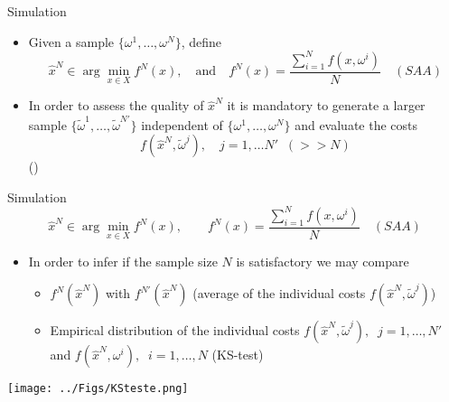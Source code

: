   
  
\begin{frame}{Simulation}

\begin{itemize}
\item Given a sample $\{\omega^1,\ldots,\omega^N\}$, define
\[
\hat x^N \in \arg \min_{x \in X} f^N(x), \quad \mbox{and}\quad f^N(x)=\frac{\sum_{i=1}^N f(x,\omega^i)}{N}\quad (SAA)
\]
\pula
\item In order to assess the quality of $\hat x^N$ it is mandatory to generate a  larger sample $\{\tilde \omega^1,\ldots,\tilde \omega^{N'}\}$ independent of $\{\omega^1,\ldots,\omega^N\}$ and evaluate the costs
\[
f(\hat x^N, \tilde \omega^j), \quad j=1,\ldots N' \;\; (>> N)
\]
()
\end{itemize}

 \end{frame} 



\begin{frame}{Simulation}
\[
\hat x^N \in \arg \min_{x \in X} f^N(x), \quad \quad f^N(x)=\frac{\sum_{i=1}^N f(x,\omega^i)}{N}\quad (SAA)
\]

\begin{itemize}
\item In order to infer if the sample size $N$  is satisfactory we may compare
\pula
\begin{itemize}
\item $f^N(\hat x^N)$ with $f^{N'}(\hat x^N)$   (average of the individual costs $f(\hat x^N, \tilde \omega^j)$)
\pula

\item Empirical distribution of the individual costs  $f(\hat x^N, \tilde \omega^j),\;\;j=1,\ldots,N'$ and $f(\hat x^N,\omega^i),\;\;i=1,\ldots,N$ (KS-test)
\end{itemize}
\end{itemize}

\begin{center}
\texttt{[image: ../Figs/KSteste.png]} {}
\end{center}
 \end{frame} 
 
